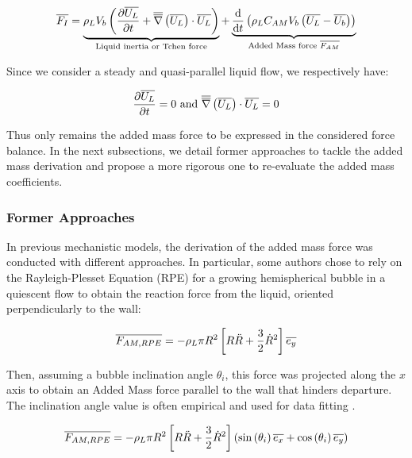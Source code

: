 \begin{equation}
\overline{F_{I}} = \underbrace{ \rho_{L}V_{b}\left( \frac{\partial{\overline{U_{L}}}}{\partial t}+\overline{\overline{\nabla}}\left({\overline{U_{L}} }\right)\cdot \overline{U_{L}} \right) }_{\text{Liquid inertia or Tchen force}} + \underbrace{ \frac{\mathrm{d}}{\mathrm{d}t}\left( \rho_{L}C_{AM}V_{b}\left( \overline{U_{L}}-\overline{U_{b}} \right) \right) }_{\text{Added Mass force } \overline{F_{AM}}}
\label{eq:F_inertia}
\end{equation}

Since we consider a steady and quasi-parallel liquid flow, we respectively have:

\begin{equation}
\dpartial{\vect{U_{L}} }{t}=0\ \text{and}\ \vecgrad{\vect{U_{L}} } \cdot \vect{U_{L}}=0
\end{equation}

Thus only remains the added mass force to be expressed in the considered force balance. In the next subsections, we detail former approaches to tackle the added mass derivation and propose a more rigorous one to re-evaluate the added mass coefficients.


\subsubsection{Former Approaches}
\label{subsubsec:former_AM}

In previous mechanistic models, the derivation of the added mass force was conducted with different approaches. In particular, some authors chose to rely on the Rayleigh-Plesset Equation (RPE) for a growing hemispherical bubble in a quiescent flow to obtain the reaction force from the liquid, oriented perpendicularly to the wall:

\begin{equation}
\overline{F_{AM,RPE}}=- \rho_{L}\pi R^{2}\left[ R\ddot{R}+\frac{3}{2}\dot{R}^{2} \right]\overline{e_{y}}
\end{equation}

Then, assuming a bubble inclination angle $\theta_{i}$, this force was projected along the $x$ axis to obtain an Added Mass force parallel to the wall that hinders departure. The inclination angle value is often empirical and used for data fitting \cite{zeng_unified_1993-1, colombo_prediction_2015, mazzocco_reassessed_2018, ren_development_2020}.

\begin{equation}
\overline{F_{AM,RPE}}=- \rho_{L}\pi R^{2}\left[ R\ddot{R}+\frac{3}{2}\dot{R}^{2} \right]\left( \mathrm{sin}\left( \theta_{i} \right)\overline{e_{x}} + \mathrm{cos}\left( \theta_{i} \right)\overline{e_{y}} \right)
\label{eq:AM_RPE}
\end{equation}


